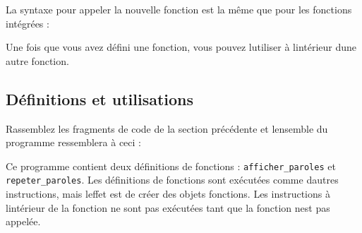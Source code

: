 La syntaxe pour appeler la nouvelle fonction est la même que pour les
fonctions intégrées :

\begin{Shaded}
\begin{Highlighting}[]
\OperatorTok{\textgreater{}\textgreater{}\textgreater{}}
\end{Highlighting}
\end{Shaded}

Une fois que vous avez défini une fonction, vous pouvez
l\textquotesingle utiliser à l\textquotesingle intérieur
d\textquotesingle une autre fonction.

\begin{Shaded}
\begin{Highlighting}[]
\end{Highlighting}
\end{Shaded}

\hypertarget{duxe9finitions-et-utilisations}{%
\subsection{Définitions et
utilisations}\label{duxe9finitions-et-utilisations}}

Rassemblez les fragments de code de la section précédente et
l\textquotesingle ensemble du programme ressemblera à ceci :

\begin{Shaded}
\begin{Highlighting}[]
    \NormalTok{(}\NormalTok{)}
    \NormalTok{(}\NormalTok{)}


\end{Highlighting}
\end{Shaded}

Ce programme contient deux définitions de fonctions :
\texttt{afficher\_paroles} et \texttt{repeter\_paroles}. Les définitions
de fonctions sont exécutées comme d\textquotesingle autres instructions,
mais l\textquotesingle effet est de créer des objets fonctions. Les
instructions à l\textquotesingle intérieur de la fonction ne sont pas
exécutées tant que la fonction n\textquotesingle est pas appelée.

